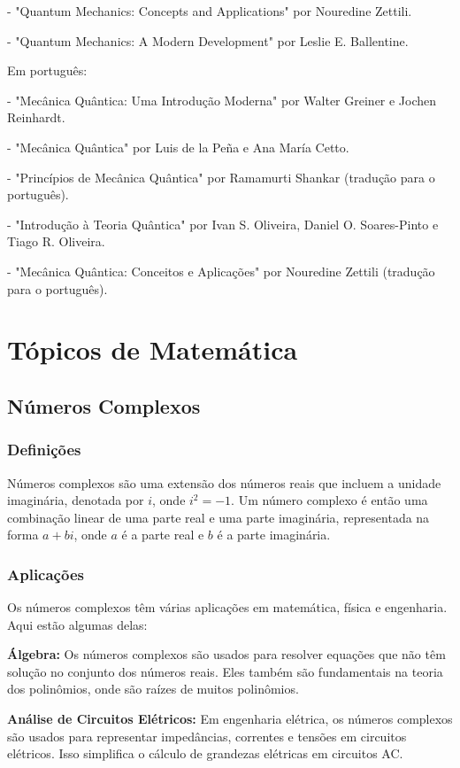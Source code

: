 \documentclass[12pt]{article}
\begin{document}
- "Quantum Mechanics: Concepts and Applications" por Nouredine Zettili.

- "Quantum Mechanics: A Modern Development" por Leslie E. Ballentine.

Em português:

- "Mecânica Quântica: Uma Introdução Moderna" por Walter Greiner e Jochen Reinhardt.

- "Mecânica Quântica" por Luis de la Peña e Ana María Cetto.

- "Princípios de Mecânica Quântica" por Ramamurti Shankar (tradução para o português).

- "Introdução à Teoria Quântica" por Ivan S. Oliveira, Daniel O. Soares-Pinto e Tiago R. Oliveira.

- "Mecânica Quântica: Conceitos e Aplicações" por Nouredine Zettili (tradução para o português).

\newpage
\section{Tópicos de Matemática}

\subsection{Números Complexos}

\subsubsection{Definições}

Números complexos são uma extensão dos números reais que incluem a unidade imaginária, denotada por $i$, onde $i^2 = -1$. Um número complexo é então uma combinação linear de uma parte real e uma parte imaginária, representada na forma $a + bi$, onde $a$ é a parte real e $b$ é a parte imaginária.

\subsubsection{Aplicações}

Os números complexos têm várias aplicações em matemática, física e engenharia. Aqui estão algumas delas:

\textbf{Álgebra:} Os números complexos são usados para resolver equações que não têm solução no conjunto dos números reais. Eles também são fundamentais na teoria dos polinômios, onde são raízes de muitos polinômios.

\textbf{Análise de Circuitos Elétricos:} Em engenharia elétrica, os números complexos são usados para representar impedâncias, correntes e tensões em circuitos elétricos. Isso simplifica o cálculo de grandezas elétricas em circuitos AC.
\end{document}
